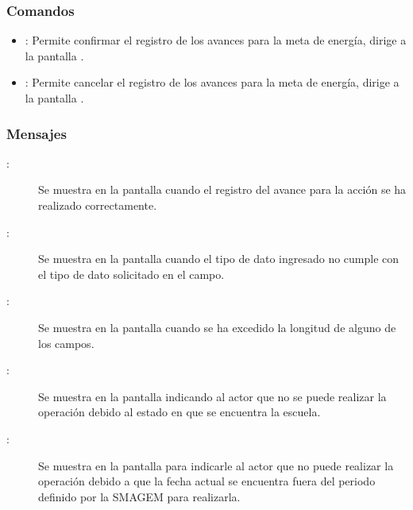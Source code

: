 \subsubsection{Comandos}
    \begin{itemize}	
	\item {}: Permite confirmar el registro de los avances para la meta de energía, dirige a la pantalla .
	\item {}: Permite cancelar el registro de los avances para la meta de energía, dirige a la pantalla .
    \end{itemize}

\subsubsection{Mensajes}

    \begin{description}
    
	    \item [:] Se muestra en la pantalla  cuando el registro del avance para la acción se ha realizado correctamente.
	    
	    \item [:] Se muestra en la pantalla  cuando el tipo de dato ingresado no cumple con el tipo de dato solicitado en el campo.
	    
	    \item [:] Se muestra en la pantalla  cuando se ha excedido la longitud de alguno de los campos.	
	    
	    \item [:] Se muestra en la pantalla  indicando al actor que no se puede realizar la operación debido al estado en que se encuentra la escuela.
	    
	    \item [:] Se muestra en la pantalla  para indicarle al actor que no puede realizar la operación debido a que la fecha actual se encuentra fuera del periodo definido por la SMAGEM para realizarla.
    \end{description}
